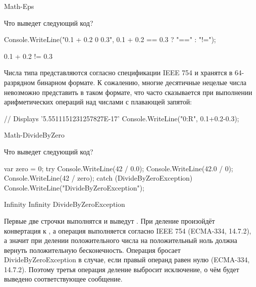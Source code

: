 \begin{defproblem}{Math-Eps}
\begin{onlyproblem}
  Что выведет следующий код?
  \begin{source}
  Console.WriteLine("0.1 + 0.2 {0} 0.3", 
    0.1 + 0.2 == 0.3 ? "==" : "!=");
  \end{source}
\end{onlyproblem}
\begin{onlysolution}
  \begin{source}
  0.1 + 0.2 != 0.3
  \end{source}
  Числа типа  представляются согласно спецификации IEEE 754 и хранятся в 64-разрядном бинарном формате. К сожалению, многие десятичные нецелые числа невозможно представить в таком формате, что часто сказывается при выполнении арифметических операций над числами с плавающей запятой:
  \begin{source}
  // Displays '5.5511151231257827E-17'
  Console.WriteLine("{0:R}", 0.1+0.2-0.3);
  \end{source}
\end{onlysolution}
\end{defproblem}
\begin{defproblem}{Math-DivideByZero}
\begin{onlyproblem}
  Что выведет следующий код?
  \begin{source}
  var zero = 0;
  try
  {
    Console.WriteLine(42 / 0.0);
    Console.WriteLine(42.0 / 0);
    Console.WriteLine(42 / zero);
  }
  catch (DivideByZeroException)
  {
    Console.WriteLine("DivideByZeroException");
  }
  \end{source}
\end{onlyproblem}
\begin{onlysolution}
  \begin{source}
  Infinity
  Infinity
  DivideByZeroException
  \end{source}
  Первые две строчки выполнятся и выведут . При деление произойдёт конвертация  к , а операция  выполняется согласно IEEE 754 (ECMA-334, 14.7.2), а значит при делении положительного числа на положительный ноль должна вернуть положительную бесконечность.
  Операция  бросает DivideByZeroException в случае, если правый операнд равен нулю (ECMA-334, 14.7.2). Поэтому третья операция деление выбросит исключение, о чём будет выведено соответствующее сообщение.
\end{onlysolution}
\end{defproblem}
